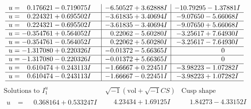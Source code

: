 \documentclass[1p]{elsarticle_modified}
\theoremstyle{definition}
\newcommand{\I}{\sqrt{-1}}
\begin{document}
$$\begin{array}{c|c|c}
\begin{aligned}
u &= \phantom{-}0.176621 - 0.719075 I\end{aligned}
 & -6.50527 + 3.62888 I & -10.79295 - 1.37881 I \\ \hline\begin{aligned}
u &= \phantom{-}0.224321 + 0.695502 I\end{aligned}
 & -3.61835 + 3.40694 I & -9.07650 - 5.66068 I \\ \hline\begin{aligned}
u &= \phantom{-}0.224321 - 0.695502 I\end{aligned}
 & -3.61835 - 3.40694 I & -9.07650 + 5.66068 I \\ \hline\begin{aligned}
u &= -0.354761 + 0.564052 I\end{aligned}
 & \phantom{-}0.22062 - 5.60280 I & -3.25617 + 7.64930 I \\ \hline\begin{aligned}
u &= -0.354761 - 0.564052 I\end{aligned}
 & \phantom{-}0.22062 + 5.60280 I & -3.25617 - 7.64930 I \\ \hline\begin{aligned}
u &= -1.317080 + 0.220326 I\end{aligned}
 & -0.01372 - 5.66365 I & \phantom{-0.000000 } 0 \\ \hline\begin{aligned}
u &= -1.317080 - 0.220326 I\end{aligned}
 & -0.01372 + 5.66365 I & \phantom{-0.000000 } 0 \\ \hline\begin{aligned}
u &= \phantom{-}0.610474 + 0.243113 I\end{aligned}
 & -1.66667 + 0.22451 I & -3.98223 - 1.07282 I \\ \hline\begin{aligned}
u &= \phantom{-}0.610474 - 0.243113 I\end{aligned}
 & -1.66667 - 0.22451 I & -3.98223 + 1.07282 I\\
 \hline 
 \end{array}$$\newpage$$\begin{array}{c|c|c}  
\text{Solutions to }I^u_{1}& \I (\text{vol} + \sqrt{-1}CS) & \text{Cusp shape}\\
 \hline 
\begin{aligned}
u &= \phantom{-}0.368164 + 0.533247 I\end{aligned}
 & \phantom{-}4.23434 + 1.69125 I & \phantom{-}1.84273 - 4.33152 I \\ \hline\begin{aligned}

\end{aligned}
\end{array}$$
\end{document}
